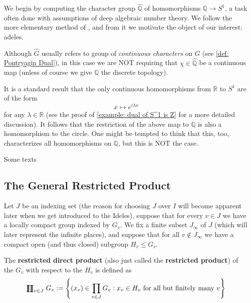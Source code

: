 \documentclass[11pt, x11names, openany]{book}
\newcommand{\qq}{\mathbb{Q}}
\newcommand{\rr}{\mathbb{R}}
\newcommand{\set}[1]{\left\{ #1 \right\}}
\newcommand{\rprod}{
    \mathrel{\ooalign{\hidewidth $\prod$ \hidewidth \cr $\coprod$}}
}
\renewcommand{\hat}{\widehat}
\begin{document}
We begin by computing the character group $\hat{\qq}$ of homomorphisms $\qq \to S^1$, a task often done with assumptions of deep algebraic number theory. We follow the more elementary method of \cite{CharGroupOfQ}, and from it we motivate the object of our interest: adeles.
\begin{warning}
    Although $\hat{G}$ usually refers to group of \textit{continuous characters} on $G$ (see \ref{def: Pontryagin Dual}), in this case we are NOT requiring that $\chi \in \hat{\qq}$ be a continuous map (unless of course we give $\qq$ the discrete topology).
\end{warning}
It is a standard result that the only continuous homomorphisms from $\rr$ to $S^1$ are of the form
\begin{equation*}
    x \mapsto e^{i \lambda x}
\end{equation*}
for any $\lambda \in \rr$ (see the proof of \ref{example: dual of S^1 is Z} for a more detailed discussion). It follows that the restriction of the above map to $\qq$ is also a homomorphism to the circle. One might be tempted to think that this, too, characterizes all homomorphisms on $\qq$, but this is NOT the case.\\


\begin{remark}
    Some texts 
\end{remark}

\subsection{The General Restricted Product}
\label{subsection: Restricted Products}
Let $J$ be an indexing set (the reason for choosing $J$ over $I$ will become apparent
later when we get introduced to the Ideles), suppose that for every $v \in J$ we have 
a locally compact group indexed by $G_v$. We fix a finite subset $J_\infty$ of $J$ (which
will later represent the infinite places), and suppose that for all $v \notin J_\infty$
we have a compact open (and thus closed) subgroup $H_v \leq G_v$.

\begin{defn}
\label{def: resprod}
The \textbf{restricted direct product} (also just called the \textbf{restricted product}) of the $G_v$ with respect to the $H_v$ is defined as 
\begin{equation*}
    \rprod_{v \in J} G_v := \set{(x_v) \in \prod_{v \in J} G_v : x_v \in H_v \text{ for all but finitely many } v}
\end{equation*}
\end{defn}
\end{document}
